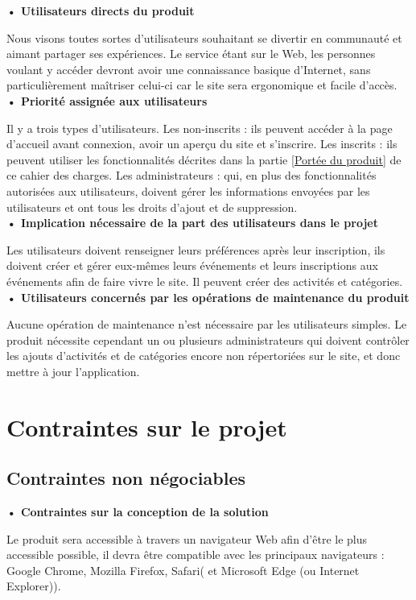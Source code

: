 \documentclass[a4paper,12pt]{article}
\begin{document}
\textbf{• Utilisateurs directs du produit}

Nous visons toutes sortes d’utilisateurs souhaitant se divertir en communauté et aimant partager ses expériences. Le service étant sur le Web, les personnes voulant y accéder devront avoir une connaissance basique d’Internet, sans particulièrement maîtriser celui-ci car le site sera ergonomique et facile d’accès. \\

\textbf{• Priorité assignée aux utilisateurs}

Il y a trois types d’utilisateurs. Les non-inscrits : ils peuvent accéder à la page d'accueil avant connexion, avoir un aperçu du site et s'inscrire. Les inscrits : ils peuvent utiliser les fonctionnalités décrites dans la partie \ref{Portée du produit} de ce cahier des charges. Les administrateurs : qui, en plus des fonctionnalités autorisées aux utilisateurs, doivent gérer les informations envoyées par les utilisateurs et ont tous les droits d'ajout et de suppression. \\

\textbf{• Implication nécessaire de la part des utilisateurs dans le projet}

Les utilisateurs doivent renseigner leurs préférences après leur inscription, ils doivent créer et gérer eux-mêmes leurs événements et leurs inscriptions aux événements afin de faire vivre le site. Il peuvent créer des activités et catégories. \\

\textbf{• Utilisateurs concernés par les opérations de maintenance du produit}

Aucune opération de maintenance n’est nécessaire par les utilisateurs simples. Le produit nécessite cependant un ou plusieurs administrateurs qui doivent contrôler les ajouts d'activités et de catégories encore non répertoriées sur le site, et donc mettre à jour l’application.

\section{Contraintes sur le projet}

\subsection{Contraintes non négociables}

\textbf{• Contraintes sur la conception de la solution}

Le produit sera accessible à travers un navigateur Web afin d’être le plus accessible possible, il devra être compatible avec les principaux navigateurs : Google Chrome, Mozilla Firefox, Safari( et Microsoft Edge (ou Internet Explorer)). \\
\end{document}
